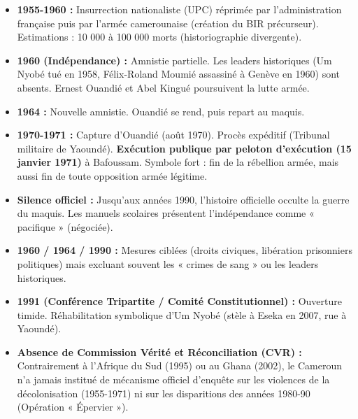 \documentclass[11pt]{article}
\begin{document}
\begin{exemplebox}
\begin{itemize}
    \item \textbf{1955-1960 :} Insurrection nationaliste (UPC) réprimée par l'administration française puis par l'armée camerounaise (création du BIR précurseur). Estimations : 10 000 à 100 000 morts (historiographie divergente).
    \item \textbf{1960 (Indépendance) :} Amnistie partielle. Les leaders historiques (Um Nyobé tué en 1958, Félix-Roland Moumié assassiné à Genève en 1960) sont absents. Ernest Ouandié et Abel Kingué poursuivent la lutte armée.
    \item \textbf{1964 :} Nouvelle amnistie. Ouandié se rend, puis repart au maquis.
    \item \textbf{1970-1971 :} Capture d'Ouandié (août 1970). Procès expéditif (Tribunal militaire de Yaoundé). \textbf{Exécution publique par peloton d'exécution (15 janvier 1971)} à Bafoussam. Symbole fort : fin de la rébellion armée, mais aussi fin de toute opposition armée légitime.
    \item \textbf{Silence officiel :} Jusqu'aux années 1990, l'histoire officielle occulte la guerre du maquis. Les manuels scolaires présentent l'indépendance comme « pacifique » (négociée).
\end{itemize}
\end{exemplebox}

\begin{aretenir}
\begin{itemize}
    \item \textbf{1960 / 1964 / 1990 :} Mesures ciblées (droits civiques, libération prisonniers politiques) mais excluant souvent les « crimes de sang » ou les leaders historiques.
    \item \textbf{1991 (Conférence Tripartite / Comité Constitutionnel) :} Ouverture timide. Réhabilitation symbolique d'Um Nyobé (stèle à Eseka en 2007, rue à Yaoundé).
    \item \textbf{Absence de Commission Vérité et Réconciliation (CVR) :} Contrairement à l'Afrique du Sud (1995) ou au Ghana (2002), le Cameroun n'a jamais institué de mécanisme officiel d'enquête sur les violences de la décolonisation (1955-1971) ni sur les disparitions des années 1980-90 (Opération « Épervier »).
\end{itemize}
\end{aretenir}
\end{document}
